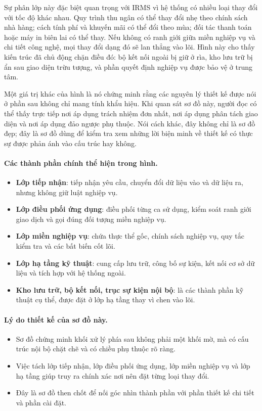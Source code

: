 \documentclass[11pt,a4paper]{article}
\begin{document}
Sự phân lớp này đặc biệt quan trọng với IRMS vì hệ thống có nhiều loại thay đổi với tốc độ khác nhau. Quy trình thu ngân có thể thay đổi nhẹ theo chính sách nhà hàng; cách tính phí và khuyến mãi có thể đổi theo mùa; đối tác thanh toán hoặc máy in biên lai có thể thay. Nếu không có ranh giới giữa miền nghiệp vụ và chi tiết công nghệ, mọi thay đổi dạng đó sẽ lan thẳng vào lõi. Hình này cho thấy kiến trúc đã chủ động chặn điều đó: bộ kết nối ngoài bị giữ ở rìa, kho lưu trữ bị ẩn sau giao diện trừu tượng, và phần quyết định nghiệp vụ được bảo vệ ở trung tâm.

Một giá trị khác của hình là nó chứng minh rằng các nguyên lý thiết kế được nói ở phần sau không chỉ mang tính khẩu hiệu. Khi quan sát sơ đồ này, người đọc có thể thấy trực tiếp nơi áp dụng trách nhiệm đơn nhất, nơi áp dụng phân tách giao diện và nơi áp dụng đảo ngược phụ thuộc. Nói cách khác, đây không chỉ là sơ đồ đẹp; đây là sơ đồ dùng để kiểm tra xem những lời biện minh về thiết kế có thực sự được phản ánh vào cấu trúc hay không.

\paragraph{Các thành phần chính thể hiện trong hình.}
\begin{itemize}
  \item \textbf{Lớp tiếp nhận}: tiếp nhận yêu cầu, chuyển đổi dữ liệu vào và dữ liệu ra, nhưng không giữ luật nghiệp vụ.
  \item \textbf{Lớp điều phối ứng dụng}: điều phối từng ca sử dụng, kiểm soát ranh giới giao dịch và gọi đúng đối tượng miền nghiệp vụ.
  \item \textbf{Lớp miền nghiệp vụ}: chứa thực thể gốc, chính sách nghiệp vụ, quy tắc kiểm tra và các bất biến cốt lõi.
  \item \textbf{Lớp hạ tầng kỹ thuật}: cung cấp lưu trữ, công bố sự kiện, kết nối cơ sở dữ liệu và tích hợp với hệ thống ngoài.
  \item \textbf{Kho lưu trữ, bộ kết nối, trục sự kiện nội bộ}: là các thành phần kỹ thuật cụ thể, được đặt ở lớp hạ tầng thay vì chen vào lõi.
\end{itemize}

\paragraph{Lý do thiết kế của sơ đồ này.}
\begin{itemize}
  \item Sơ đồ chứng minh khối xử lý phía sau không phải một khối mờ, mà có cấu trúc nội bộ chặt chẽ và có chiều phụ thuộc rõ ràng.
  \item Việc tách lớp tiếp nhận, lớp điều phối ứng dụng, lớp miền nghiệp vụ và lớp hạ tầng giúp truy ra chính xác nơi nên đặt từng loại thay đổi.
  \item Đây là sơ đồ then chốt để nối góc nhìn thành phần với phần thiết kế chi tiết và phần cài đặt.
\end{itemize}
\end{document}
